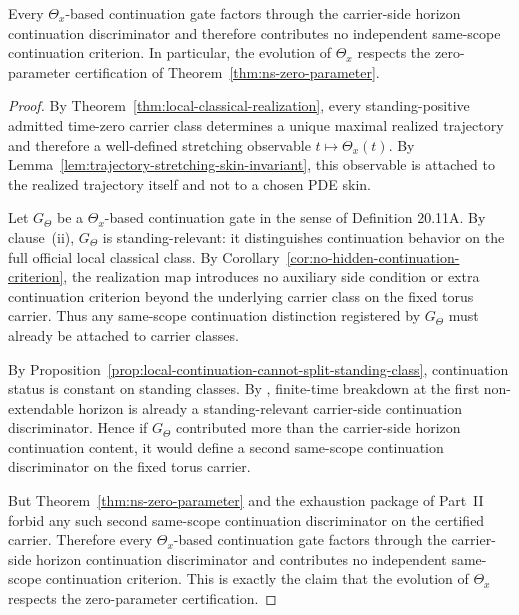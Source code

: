 \begin{theorem}
\label{thm:dynamic-stretching-compatibility}
Every $\Theta_x$-based continuation gate factors through the carrier-side horizon continuation discriminator and therefore contributes no independent same-scope continuation criterion. In particular, the evolution of $\Theta_x$ respects the zero-parameter certification of Theorem~\ref{thm:ns-zero-parameter}.
\end{theorem}

\begin{proof}
By Theorem~\ref{thm:local-classical-realization}, every standing-positive admitted time-zero carrier class determines a unique maximal realized trajectory and therefore a well-defined stretching observable $t\mapsto \Theta_x(t)$. By Lemma~\ref{lem:trajectory-stretching-skin-invariant}, this observable is attached to the realized trajectory itself and not to a chosen PDE skin.

Let $G_{\Theta}$ be a $\Theta_x$-based continuation gate in the sense of Definition 20.11A. By clause~(ii), $G_{\Theta}$ is standing-relevant: it distinguishes continuation behavior on the full official local classical class. By Corollary~\ref{cor:no-hidden-continuation-criterion}, the realization map introduces no auxiliary side condition or extra continuation criterion beyond the underlying carrier class on the fixed torus carrier. Thus any same-scope continuation distinction registered by $G_{\Theta}$ must already be attached to carrier classes.

By Proposition~\ref{prop:local-continuation-cannot-split-standing-class}, continuation status is constant on standing classes. By \HorizonDetectabilityRef{}, finite-time breakdown at the first non-extendable horizon is already a standing-relevant carrier-side continuation discriminator. Hence if $G_{\Theta}$ contributed more than the carrier-side horizon continuation content, it would define a second same-scope continuation discriminator on the fixed torus carrier.

But Theorem~\ref{thm:ns-zero-parameter} and the exhaustion package of Part~II forbid any such second same-scope continuation discriminator on the certified carrier. Therefore every $\Theta_x$-based continuation gate factors through the carrier-side horizon continuation discriminator and contributes no independent same-scope continuation criterion. This is exactly the claim that the evolution of $\Theta_x$ respects the zero-parameter certification.
\end{proof}

